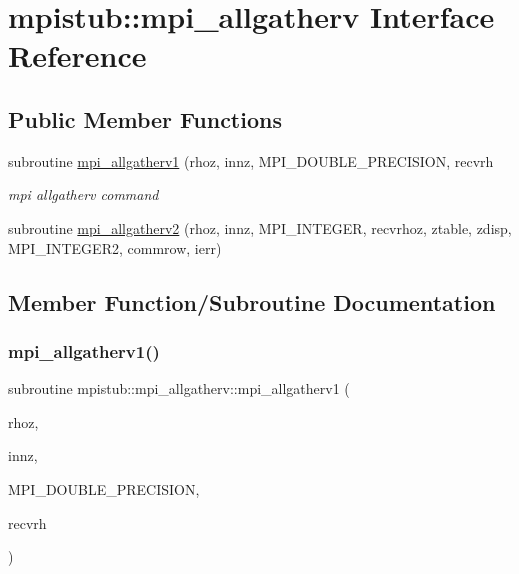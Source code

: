 \hypertarget{interfacempistub_1_1mpi__allgatherv}{}\section{mpistub\+::mpi\+\_\+allgatherv Interface Reference}
\label{interfacempistub_1_1mpi__allgatherv}
\subsection*{Public Member Functions}
\begin{DoxyCompactItemize}
\item 
subroutine \mbox{\hyperlink{interfacempistub_1_1mpi__allgatherv_a47279f9d6dcae39ac2a210fa6d447eab}{mpi\+\_\+allgatherv1}} (rhoz, innz, M\+P\+I\+\_\+\+D\+O\+U\+B\+L\+E\+\_\+\+P\+R\+E\+C\+I\+S\+I\+ON, recvrh
\begin{DoxyCompactList}\small\item\em mpi allgatherv command \end{DoxyCompactList}\item 
subroutine \mbox{\hyperlink{interfacempistub_1_1mpi__allgatherv_a1b8326d4776e2f450a05bd8de2f21512}{mpi\+\_\+allgatherv2}} (rhoz, innz, M\+P\+I\+\_\+\+I\+N\+T\+E\+G\+ER, recvrhoz, ztable, zdisp, M\+P\+I\+\_\+\+I\+N\+T\+E\+G\+E\+R2, commrow, ierr)
\end{DoxyCompactItemize}


\subsection{Member Function/\+Subroutine Documentation}
\mbox{\label{interfacempistub_1_1mpi__allgatherv_a47279f9d6dcae39ac2a210fa6d447eab}} 
\subsubsection{\texorpdfstring{mpi\_allgatherv1()}{mpi\_allgatherv1()}}
{\footnotesize\ttfamily subroutine mpistub\+::mpi\+\_\+allgatherv\+::mpi\+\_\+allgatherv1 (\begin{DoxyParamCaption}\item[{double precision, dimension(\+:)}]{rhoz,  }\item[{}]{innz,  }\item[{}]{M\+P\+I\+\_\+\+D\+O\+U\+B\+L\+E\+\_\+\+P\+R\+E\+C\+I\+S\+I\+ON,  }\item[{}]{recvrh }\end{DoxyParamCaption})}




